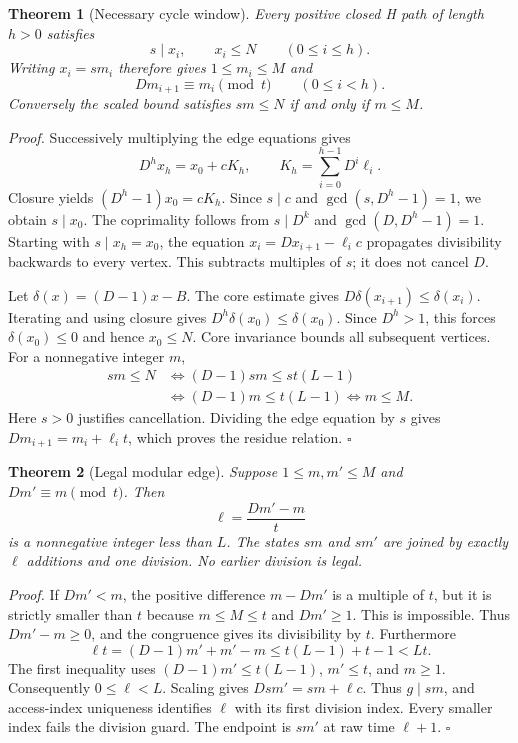 \documentclass[11pt,letterpaper]{article}
\newtheorem{theorem}{Theorem}
\newenvironment{proof}{\noindent\textit{Proof.}}{\hfill\(\square\)}
\begin{document}
\begin{theorem}[Necessary cycle window]
\label{thm:necessary}
Every positive closed H path of length $h>0$ satisfies
\[
s\mid x_i,\qquad x_i\le N\qquad(0\le i\le h).
\]
Writing $x_i=sm_i$ therefore gives $1\le m_i\le M$ and
\[
Dm_{i+1}\equiv m_i\pmod t\qquad(0\le i<h).
\]
Conversely the scaled bound satisfies $sm\le N$ if and only if $m\le M$.
\end{theorem}
\begin{proof}
Successively multiplying the edge equations gives
\[
D^h x_h=x_0+cK_h,\qquad K_h=\sum_{i=0}^{h-1}D^i\ell_i.
\]
Closure yields $(D^h-1)x_0=cK_h$. Since $s\mid c$ and
$\gcd(s,D^h-1)=1$, we obtain $s\mid x_0$. The coprimality follows from
$s\mid D^k$ and $\gcd(D,D^h-1)=1$.
Starting with $s\mid x_h=x_0$, the equation
$x_i=Dx_{i+1}-\ell_i c$ propagates divisibility backwards to every vertex.
This subtracts multiples of $s$; it does not cancel $D$.

Let $\delta(x)=(D-1)x-B$. The core estimate gives
$D\delta(x_{i+1})\le\delta(x_i)$. Iterating and using closure gives
$D^h\delta(x_0)\le\delta(x_0)$. Since $D^h>1$, this forces
$\delta(x_0)\le0$ and hence $x_0\le N$. Core invariance bounds all subsequent
vertices. For a nonnegative integer $m$,
\[
\begin{aligned}
sm\le N &\iff (D-1)sm\le st(L-1)\\
 &\iff (D-1)m\le t(L-1)\iff m\le M.
\end{aligned}
\]
Here $s>0$ justifies cancellation. Dividing the edge equation by $s$ gives
$Dm_{i+1}=m_i+\ell_i t$, which proves the residue relation.
\end{proof}

\begin{theorem}[Legal modular edge]
\label{thm:edge}
Suppose $1\le m,m'\le M$ and $Dm'\equiv m\pmod t$. Then
\[
\ell=\frac{Dm'-m}{t}
\]
is a nonnegative integer less than $L$. The states $sm$ and $sm'$ are joined
by exactly $\ell$ additions and one division. No earlier division is legal.
\end{theorem}
\begin{proof}
If $Dm'<m$, the positive difference $m-Dm'$ is a multiple of $t$, but it is
strictly smaller than $t$ because $m\le M\le t$ and $Dm'\ge1$. This is
impossible. Thus $Dm'-m\ge0$, and the congruence gives its divisibility by $t$.
Furthermore
\[
\ell t=(D-1)m'+m'-m
\le t(L-1)+t-1<Lt.
\]
The first inequality uses $(D-1)m'\le t(L-1)$, $m'\le t$, and $m\ge1$.
Consequently $0\le\ell<L$. Scaling gives
$Dsm'=sm+\ell c$. Thus $g\mid sm$, and access-index uniqueness identifies
$\ell$ with its first division index. Every smaller index fails the division
guard. The endpoint is $sm'$ at raw time $\ell+1$.
\end{proof}
\end{document}
